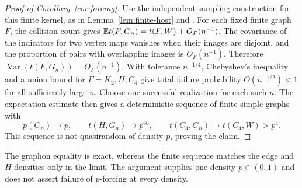 \begin{proof}[Proof of Corollary~\ref{cor:forcing}]
Use the independent sampling construction for this finite kernel,
as in Lemma~\ref{lem:finite-host} and
\cite[Section~2.6, Lemma~2.4]{lovaszszegedy2006}. For each fixed finite graph \(F\),
the collision count gives
\(\mathbb E t(F,G_n)=t(F,W)+O_F(n^{-1})\). The covariance of the indicators
for two vertex maps vanishes when their images are disjoint, and the
proportion of pairs with overlapping images is \(O_F(n^{-1})\).
Therefore \(\operatorname{Var}(t(F,G_n))=O_F(n^{-1})\). With tolerance
\(n^{-1/4}\), Chebyshev's inequality and a union bound for
\(F=K_2,H,C_4\) give total failure probability
\(O(n^{-1/2})<1\) for all sufficiently large \(n\). Choose one
successful realization for each such \(n\). The expectation estimate
then gives a deterministic sequence of finite simple graphs with
\[
p(G_n)\to p,\qquad t(H,G_n)\to p^{66},\qquad
t(C_4,G_n)\to t(C_4,W)>p^4.
\]
This sequence is not quasirandom of density \(p\), proving the claim.
\end{proof}

The graphon equality is exact, whereas the finite sequence matches the
edge and $H$-densities only in the limit. The argument supplies one
density $p\in(0,1)$ and does not assert failure of $p$-forcing at every
density.
